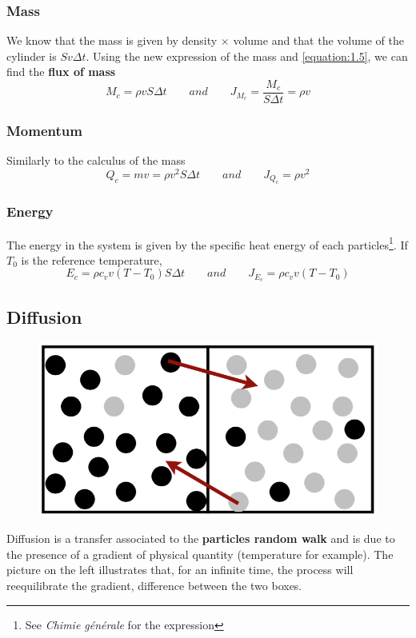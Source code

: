 \subsubsection{Mass}
We know that the mass is given by density $\times$ volume and that the volume of the cylinder is $Sv\Delta t$. Using the new expression of the mass and \eqref{equation:1.5}, we can find the \textbf{flux of mass} 
\begin{equation}
	M_c = \rho v S \Delta t \qquad and \qquad  J_{M_c} = \frac{M_c}{S\Delta t} = \rho v
\end{equation}
	
\subsubsection{Momentum}
Similarly to the calculus of the mass
\begin{equation}
	Q_c = mv = \rho v^2 S \Delta t \qquad and \qquad J_{Q_c} = \rho v^2
\end{equation}
	
\subsubsection{Energy}
The energy in the system is given by the specific heat energy of each particles\footnote{See \emph{Chimie générale} for the expression}. If $T_0$ is the reference temperature, 
\begin{equation}
	E_c = \rho c_v v (T-T_0) S \Delta t \qquad and \qquad J_{E_c} = \rho c_v v (T-T_0)
\end{equation}
	
\subsection{Diffusion}
\begin{figure}
	\vspace{-5mm}
	\includegraphics[scale=0.26]{ch1/3}
\end{figure}
Diffusion is a transfer associated to the \textbf{particles	random walk} and is due to the presence of a gradient of physical quantity (temperature for example). The picture on the left illustrates that, for an infinite time, the process will reequilibrate the gradient, difference between the two boxes.
	
